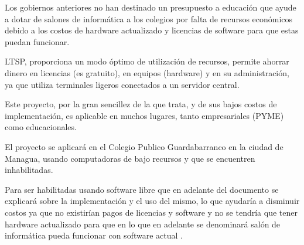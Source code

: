 \documentclass[11pt]{report}
\begin{document}
Los gobiernos anteriores no han destinado un presupuesto a educaci\'on que ayude a dotar de salones de inform\'atica a los colegios por falta de 
recursos econ\'omicos debido a los costos de hardware actualizado y licencias de software para que estas puedan funcionar.

LTSP, proporciona un modo \'optimo de utilización de recursos, permite ahorrar dinero en licencias (es gratuito), en equipos 
(hardware) y en su administraci\'on, ya que utiliza terminales ligeros conectados a un servidor central. 
 
Este proyecto, por la gran sencillez de la que trata, y de sus bajos costos de implementaci\'on, es aplicable en muchos lugares, tanto empresariales 
(PYME) como educacionales. 

El proyecto se aplicar\'a en el Colegio Publico Guardabarranco en la ciudad de Managua, usando computadoras de bajo recursos y que se encuentren 
inhabilitadas. 

Para ser habilitadas usando software libre que en adelante del documento se explicar\'a sobre la implementaci\'on y el uso del mismo, lo que 
ayudar\'ia a disminuir costos ya que no existir\'ian pagos de licencias y software y no se tendr\'ia que tener hardware actualizado para que en lo que en 
adelante se denominar\'a sal\'on de inform\'atica pueda funcionar con software actual .
\end{document}

